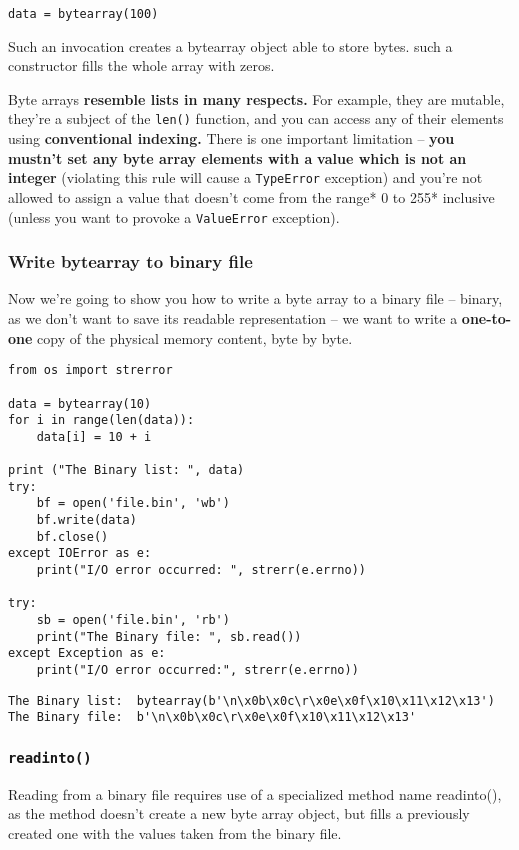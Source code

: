\documentclass[11pt]{article}
\begin{document}
\texttt{data = bytearray(100)}

Such an invocation creates a bytearray object able to store
bytes. such a constructor fills the whole array with zeros.

Byte arrays \textbf{resemble lists in many respects.} For example, they are
mutable, they’re a subject of the \texttt{len()} function, and you can access
any of their elements using \textbf{conventional indexing.} There is one
important limitation – \textbf{you mustn’t set any byte array elements with a}
\textbf{value which is not an integer} (violating this rule will cause a
\texttt{TypeError} exception) and you’re not allowed to assign a value that
doesn’t come from the range* 0 to 255* inclusive (unless you want to
provoke a \texttt{ValueError} exception).

\subsubsection{Write bytearray to binary file}
\label{sec:orga84a270}
Now we’re going to show you how to write a byte array to a binary file
– binary, as we don’t want to save its readable representation – we
want to write a \textbf{one-to-one} copy of the physical memory content, byte
by byte.

\begin{verbatim}
from os import strerror

data = bytearray(10)
for i in range(len(data)):
	data[i] = 10 + i

print ("The Binary list: ", data)
try:
	bf = open('file.bin', 'wb')
	bf.write(data)
	bf.close()
except IOError as e:
	print("I/O error occurred: ", strerr(e.errno))

try:
	sb = open('file.bin', 'rb')
	print("The Binary file: ", sb.read())
except Exception as e:
	print("I/O error occurred:", strerr(e.errno))
\end{verbatim}

\begin{verbatim}
The Binary list:  bytearray(b'\n\x0b\x0c\r\x0e\x0f\x10\x11\x12\x13')
The Binary file:  b'\n\x0b\x0c\r\x0e\x0f\x10\x11\x12\x13'
\end{verbatim}

\subsubsection{\texttt{readinto()}}
\label{sec:org40f5889}
Reading from a binary file requires use of a specialized method name
readinto(), as the method doesn’t create a new byte array object, but
fills a previously created one with the values taken from the binary
file.
\end{document}
